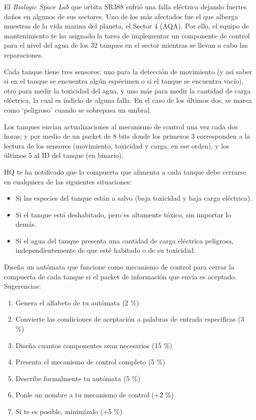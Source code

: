 \documentclass[8pt, onside]{article}
\begin{document}
El \textit{Biologic Space Lab} que orbita \textsc{SR388} sufrió una falla eléctrica dejando fuertes daños en algunos de sus sectores. Uno de los más afectados fue el que alberga muestras de la vida marina del planeta, el Sector 4 (AQA). Por ello, el equipo de mantenimiento te ha asignado la tarea de implementar un componente de control para el nivel del agua de los 32 tanques en el sector mientras se llevan a cabo las reparaciones.

Cada tanque tiene tres sensores: uno para la detección de movimiento (y así saber si en el tanque se encuentra algún espécimen o si el tanque se encuentra vacío), otro para medir la toxicidad del agua, y uno más para medir la cantidad de carga eléctrica, la cual es indicio de alguna falla. En el caso de los últimos dos, se marca como `peligroso' cuando se sobrepasa un umbral.

Los tanques envían actualizaciones al mecanismo de control una vez cada dos horas; y por medio de un packet de 8 bits donde los primeros 3 corresponden a la lectura de los sensores (movimiento, toxicidad y carga, en ese orden), y los últimos 5 al ID del tanque (en binario).

HQ te ha notificado que la compuerta que alimenta a cada tanque debe cerrarse en cualquiera de las siguientes situaciones:

\begin{itemize}
    \itemsep0em
    \item Si las especies del tanque están a salvo (baja toxicidad y baja carga eléctrica).
    \item Si el tanque está deshabitado, pero es altamente tóxico, sin importar lo demás.
    \item Si el agua del tanque presenta una cantidad de carga eléctrica peligrosa, independientemente de que esté habitado o de su toxicidad.
\end{itemize}

Diseña un autómata que funcione como mecanismo de control para cerrar la compuerta de cada tanque si el packet de información que envía es aceptado. Sugerencias:

\begin{enumerate}[label=\tt \alph*)]
    \itemsep0em
    \item Genera el alfabeto de tu autómata (2 \%)
    \item Convierte las condiciones de aceptación a palabras de entrada específicas (3 \%)
    \item Diseña cuantos componentes sean necesarios (15 \%)
    \item Presenta el mecanismo de control completo (5 \%)
    \item Describe formalmente tu autómata (5 \%)
    \item Ponle un nombre a tu mecanismo de control (+2 \%)
    \item Si te es posible, minimízalo (+5 \%)
\end{enumerate}
\end{document}
